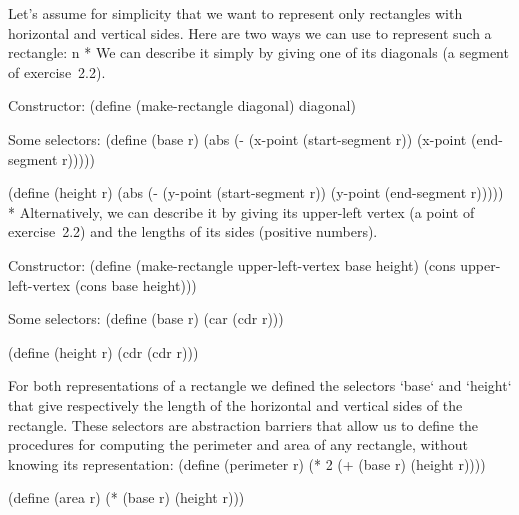 Let's assume for simplicity that we want to represent only rectangles with horizontal and vertical sides.
Here are two ways we can use to represent such a rectangle:
\begitems\style n
* We can describe it simply by giving one of its diagonals (a segment of exercise~2.2).

Constructor:
\begtt\scm
(define (make-rectangle diagonal)
  diagonal)
\endtt

Some selectors:
\begtt\scm
(define (base r)
  (abs (- (x-point (start-segment r))
          (x-point (end-segment r)))))

(define (height r)
  (abs (- (y-point (start-segment r))
          (y-point (end-segment r)))))
\endtt
* Alternatively, we can describe it by giving its upper-left vertex (a point of exercise~2.2) and the lengths of its sides (positive numbers).
\smallskip

Constructor:
\begtt\scm
(define (make-rectangle upper-left-vertex base height)
  (cons upper-left-vertex
        (cons base height)))
\endtt

Some selectors:
\begtt\scm
(define (base r)
  (car (cdr r)))

(define (height r)
  (cdr (cdr r)))
\endtt
\enditems
\begtt\scm
\endtt

For both representations of a rectangle we defined the selectors `base` and `height` that give respectively the length of the horizontal and vertical sides of the rectangle.
These selectors are abstraction barriers that allow us to define the procedures for computing the perimeter and area of any rectangle, without knowing its representation:
\begtt\scm
(define (perimeter r)
  (* 2 (+ (base r)
          (height r))))

(define (area r)
  (* (base r)
     (height r)))
\endtt
